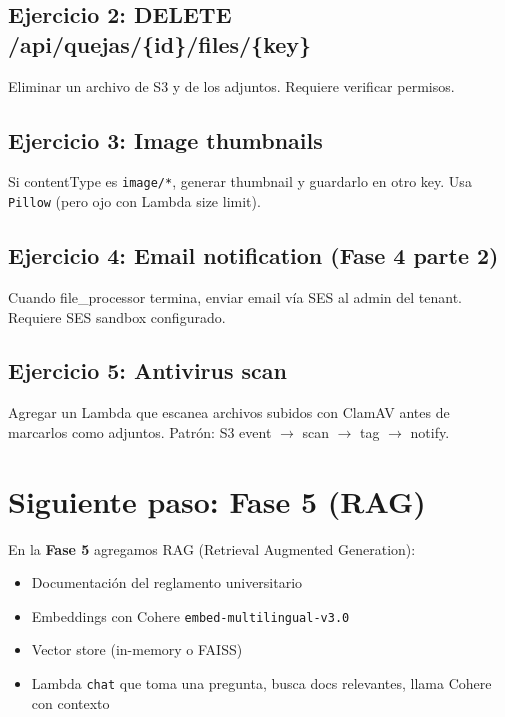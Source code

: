 \documentclass[11pt,a4paper,oneside]{article}
\begin{document}
\subsection{Ejercicio 2: DELETE /api/quejas/\{id\}/files/\{key\}}

Eliminar un archivo de S3 y de los adjuntos. Requiere verificar permisos.

\subsection{Ejercicio 3: Image thumbnails}

Si contentType es \texttt{image/*}, generar thumbnail y guardarlo en otro key. Usa \texttt{Pillow} (pero ojo con Lambda size limit).

\subsection{Ejercicio 4: Email notification (Fase 4 parte 2)}

Cuando file\_processor termina, enviar email v\'ia SES al admin del tenant. Requiere SES sandbox configurado.

\subsection{Ejercicio 5: Antivirus scan}

Agregar un Lambda que escanea archivos subidos con ClamAV antes de marcarlos como adjuntos. Patr\'on: S3 event $\rightarrow$ scan $\rightarrow$ tag $\rightarrow$ notify.

\section{Siguiente paso: Fase 5 (RAG)}

En la \textbf{Fase 5} agregamos RAG (Retrieval Augmented Generation):

\begin{itemize}
  \item Documentaci\'on del reglamento universitario
  \item Embeddings con Cohere \texttt{embed-multilingual-v3.0}
  \item Vector store (in-memory o FAISS)
  \item Lambda \texttt{chat} que toma una pregunta, busca docs relevantes, llama Cohere con contexto
\end{itemize}
\end{document}
